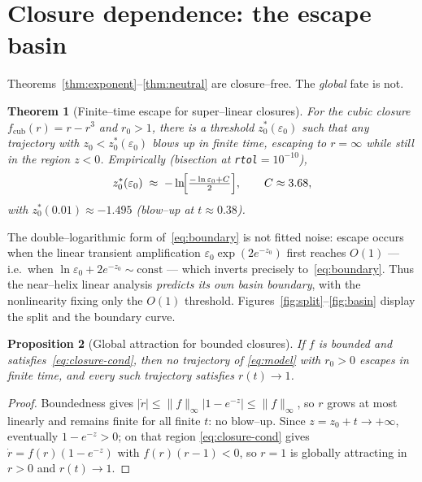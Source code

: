 \documentclass[11pt]{article}
\theoremstyle{plain}
\newtheorem{theorem}{Theorem}
\newtheorem{proposition}[theorem]{Proposition}
\theoremstyle{definition}
\newcommand{\eps}{\varepsilon}
\begin{document}
\section{Closure dependence: the escape basin}\label{sec:closure}

Theorems~\ref{thm:exponent}--\ref{thm:neutral} are closure--free. The
\emph{global} fate is not.

\begin{theorem}[Finite--time escape for super--linear closures]\label{thm:escape}
For the cubic closure $f_{\mathrm{cub}}(r)=r-r^3$ and $r_0>1$, there is a
threshold $z_0^\ast(\eps_0)$ such that any trajectory with $z_0<z_0^\ast(\eps_0)$
blows up in finite time, escaping to $r=\infty$ while still in the region
$z<0$. Empirically (bisection at \texttt{rtol}$=10^{-10}$),
\begin{equation}\label{eq:boundary}
z_0^\ast(\eps_0)\;\approx\;-\ln\!\Bigl[\tfrac{-\ln\eps_0 + C}{2}\Bigr],
\qquad C\approx 3.68,
\end{equation}
with $z_0^\ast(0.01)\approx-1.495$ (blow--up at $t\approx0.38$).
\end{theorem}

\noindent The double--logarithmic form of~\eqref{eq:boundary} is not fitted
noise: escape occurs when the linear transient amplification
$\eps_0\exp(2e^{-z_0})$ first reaches $O(1)$ --- i.e.\ when
$\ln\eps_0+2e^{-z_0}\sim\text{const}$ --- which inverts precisely
to~\eqref{eq:boundary}. Thus the near--helix linear analysis
\emph{predicts its own basin boundary}, with the nonlinearity fixing only the
$O(1)$ threshold. Figures~\ref{fig:split}--\ref{fig:basin} display the split
and the boundary curve.

\begin{proposition}[Global attraction for bounded closures]\label{prop:bounded}
If $f$ is bounded and satisfies~\eqref{eq:closure-cond}, then no trajectory of
\eqref{eq:model} with $r_0>0$ escapes in finite time, and every such
trajectory satisfies $r(t)\to1$.
\end{proposition}

\begin{proof}
Boundedness gives $|\dot r|\le \|f\|_\infty|1-e^{-z}|\le\|f\|_\infty$, so $r$
grows at most linearly and remains finite for all finite $t$: no blow--up.
Since $z=z_0+t\to+\infty$, eventually $1-e^{-z}>0$; on that region
\eqref{eq:closure-cond} gives $\dot r=f(r)(1-e^{-z})$ with $f(r)(r-1)<0$, so
$r=1$ is globally attracting in $r>0$ and $r(t)\to1$.
\end{proof}
\end{document}
